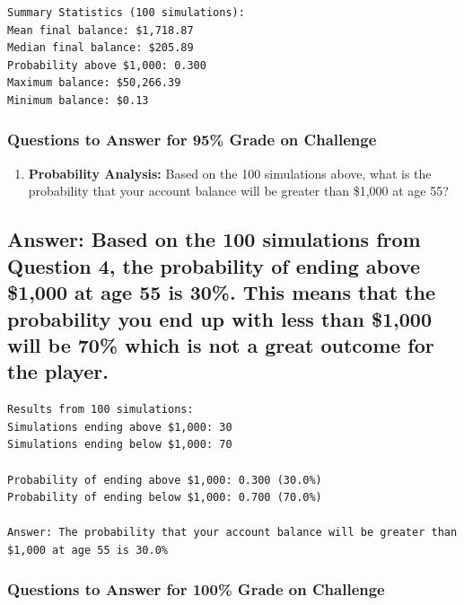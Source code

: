 \documentclass[
  letterpaper,
  DIV=11,
  numbers=noendperiod]{scrartcl}
\providecommand{\tightlist}{%
  \setlength{\itemsep}{0pt}\setlength{\parskip}{0pt}}
\begin{document}
\begin{verbatim}
Summary Statistics (100 simulations):
Mean final balance: $1,718.87
Median final balance: $205.89
Probability above $1,000: 0.300
Maximum balance: $50,266.39
Minimum balance: $0.13
\end{verbatim}

\subsubsection{Questions to Answer for 95\% Grade on
Challenge}\label{questions-to-answer-for-95-grade-on-challenge}

\begin{enumerate}
\def\labelenumi{\arabic{enumi}.}
\setcounter{enumi}{4}
\tightlist
\item
  \textbf{Probability Analysis:} Based on the 100 simulations above,
  what is the probability that your account balance will be greater than
  \$1,000 at age 55?
\end{enumerate}

\subsection{Answer: Based on the 100 simulations from Question 4, the
probability of ending above \$1,000 at age 55 is 30\%. This means that
the probability you end up with less than \$1,000 will be 70\% which is
not a great outcome for the
player.}\label{answer-based-on-the-100-simulations-from-question-4-the-probability-of-ending-above-1000-at-age-55-is-30.-this-means-that-the-probability-you-end-up-with-less-than-1000-will-be-70-which-is-not-a-great-outcome-for-the-player.}

\label{q5-probability-analysis}
\begin{verbatim}
Results from 100 simulations:
Simulations ending above $1,000: 30
Simulations ending below $1,000: 70

Probability of ending above $1,000: 0.300 (30.0%)
Probability of ending below $1,000: 0.700 (70.0%)

Answer: The probability that your account balance will be greater than $1,000 at age 55 is 30.0%
\end{verbatim}

\subsubsection{Questions to Answer for 100\% Grade on
Challenge}\label{questions-to-answer-for-100-grade-on-challenge}
\end{document}
